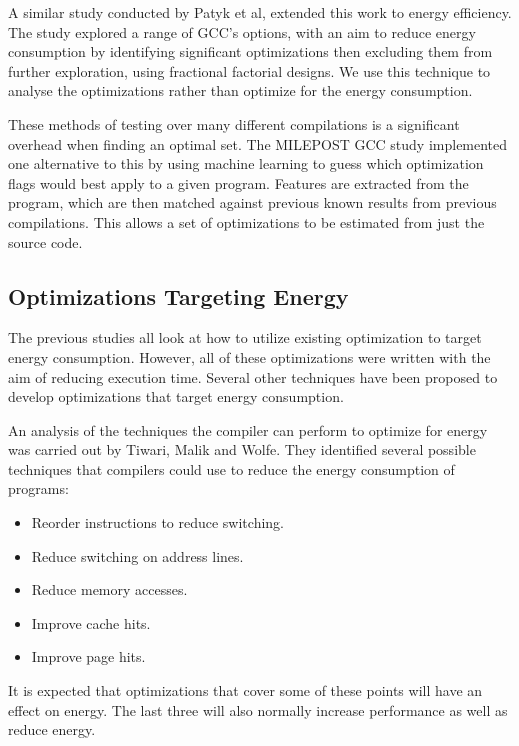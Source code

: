 \documentclass[twocolumn]{article}
\begin{document}
A similar study conducted by Patyk et al\cite{EnergyReductionCompilerOptions}, extended this work to energy efficiency. The study explored a range of GCC's options, with an aim to reduce energy consumption by identifying significant optimizations then excluding them from further exploration, using fractional factorial designs. We use this technique to analyse the optimizations rather than optimize for the energy consumption.

These methods of testing over many different compilations is a significant overhead when finding an optimal set. The MILEPOST GCC\cite{Fursin2011} study implemented one alternative to this by using machine learning to guess which optimization flags would best apply to a given program. Features are extracted from the program, which are then matched against previous known results from previous compilations. This allows a set of optimizations to be estimated from just the source code.

\subsection{Optimizations Targeting Energy}

The previous studies all look at how to utilize existing optimization to target energy consumption. However, all of these optimizations were written with the aim of reducing execution time. Several other techniques have been proposed to develop optimizations that target energy consumption.

An analysis of the techniques the compiler can perform to optimize for energy was carried out by Tiwari, Malik and Wolfe\cite{CompilationTechniquesForLowEnergy}. They identified several possible techniques that compilers could use to reduce the energy consumption of programs:
\begin{itemize}
	\setlength{\itemsep}{-0.4em}
	\vspace{-2mm}

	\item Reorder instructions to reduce switching.
	\item Reduce switching on address lines.
	\item Reduce memory accesses.
	\item Improve cache hits.
	\item Improve page hits.
\end{itemize}

It is expected that optimizations that cover some of these points will have an effect on energy. The last three will also normally increase performance as well as reduce energy.
\end{document}
